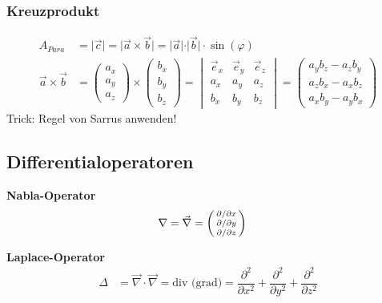 	\subsubsection{Kreuzprodukt}
		\begingroup
		\renewcommand*{\arraystretch}{.95}
		\begin{align*}
			A_{Para}             & = \vert \vec{c} \vert = \vert \vec{a} \times \vec{b} \vert = \vert \vec{a} \vert \cdot \vert \vec{b} \vert \cdot \sin(\varphi) \\
			\vec{a}\times\vec{b} & =
			\begin{pmatrix}
				a_x \\
				a_y \\
				a_z
			\end{pmatrix}
			\times
			\begin{pmatrix}
				b_x \\
				b_y \\
				b_z
			\end{pmatrix} =
			\begin{vmatrix}
				\vec{e}_x & \vec{e}_y & \vec{e}_z \\
				a_x       & a_y       & a_z       \\
				b_x       & b_y       & b_z	
			\end{vmatrix} = 
			\begin{pmatrix}
				a_yb_z-a_zb_y \\
				a_zb_x-a_xb_z \\
				a_xb_y-a_yb_x
			\end{pmatrix}
		\end{align*}
		\endgroup
		Trick: Regel von Sarrus anwenden!

\subsection{Differentialoperatoren}
	\textbf{Nabla-Operator}
	\begin{align*}
		\nabla & = \vec{\nabla} =
		\begin{psmallmatrix}
			\partial  / \partial x \\
			\partial  / \partial y \\
			\partial  / \partial z
		\end{psmallmatrix}
	\end{align*}

	\textbf{Laplace-Operator}
	\begin{align*}
		\varDelta & = \vec{\nabla} \cdot \vec{\nabla} = \textrm{div (grad)} =
		\dfrac{\partial ^2}{\partial x^2}+\dfrac{\partial ^2}{\partial y^2}+\dfrac{\partial ^2}{\partial z^2}
	\end{align*}

